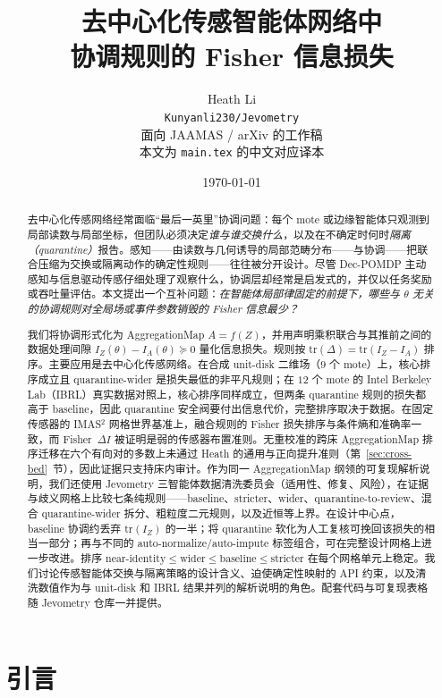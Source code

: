 \documentclass[11pt,a4paper]{article}
\title{去中心化传感智能体网络中\\协调规则的 Fisher 信息损失}
\author{
  Heath Li\\
  \texttt{Kunyanli230/Jevometry}\\
  \small 面向 JAAMAS / arXiv 的工作稿\\
  \small 本文为 \texttt{main.tex} 的中文对应译本
}
\date{\today}
\begin{document}
\maketitle

\begin{abstract}
去中心化传感网络经常面临“最后一英里”协调问题：每个 mote 或边缘智能体只观测到局部读数与局部坐标，但团队必须决定\emph{谁与谁交换什么}，以及在不确定时何时\emph{隔离（quarantine）}报告。感知——由读数与几何诱导的局部范畴分布——与协调——把联合压缩为交换或隔离动作的确定性规则——往往被分开设计。尽管 Dec-POMDP 主动感知与信息驱动传感仔细处理了观察什么，协调层却经常是启发式的，并仅以任务奖励或吞吐量评估。本文提出一个互补问题：\emph{在智能体局部律固定的前提下，哪些与 $\theta$ 无关的协调规则对全局场或事件参数销毁的 Fisher 信息最少？}

我们将协调形式化为 AggregationMap $A=f(Z)$，并用声明乘积联合与其推前之间的数据处理间隙 $I_Z(\theta)-I_A(\theta)\succeq 0$ 量化信息损失。规则按 $\mathrm{tr}(\Delta)=\mathrm{tr}(I_Z-I_A)$ 排序。主要应用是去中心化传感网络。在合成 unit-disk 二维场（$9$ 个 mote）上，核心排序成立且 quarantine-wider 是损失最低的非平凡规则；在 $12$ 个 mote 的 Intel Berkeley Lab（IBRL）真实数据对照上，核心排序同样成立，但两条 quarantine 规则的损失都高于 baseline，因此 quarantine 安全阀要付出信息代价，完整排序取决于数据。在固定传感器的 IMAS$^2$ 网格世界基准上，融合规则的 Fisher 损失排序与条件熵和准确率一致，而 Fisher~$\Delta I$ 被证明是弱的传感器布置准则。无重校准的跨床 AggregationMap 排序迁移在六个有向对的多数上未通过 Heath 的通用与正向提升准则（第~\ref{sec:cross-bed}~节），因此证据只支持床内审计。作为同一 AggregationMap 纲领的可复现解析说明，我们还使用 Jevometry 三智能体数据清洗委员会（适用性、修复、风险），在证据与歧义网格上比较七条纯规则——baseline、stricter、wider、quarantine-to-review、混合 quarantine-wider 拆分、粗粒度二元规则，以及近恒等上界。在设计中心点，baseline 协调约丢弃 $\mathrm{tr}(I_Z)$ 的一半；将 quarantine 软化为人工复核可挽回该损失的相当一部分；再与不同的 auto-normalize/auto-impute 标签组合，可在完整设计网格上进一步改进。排序
$\mathrm{near\text{-}identity}\le\mathrm{wider}\le\mathrm{baseline}
\le\mathrm{stricter}$
在每个网格单元上稳定。我们讨论传感智能体交换与隔离策略的设计含义、迫使确定性映射的 API 约束，以及清洗数值作为与 unit-disk 和 IBRL 结果并列的解析说明的角色。配套代码与可复现表格随 Jevometry 仓库一并提供。
\end{abstract}

\section{引言}
\end{document}
